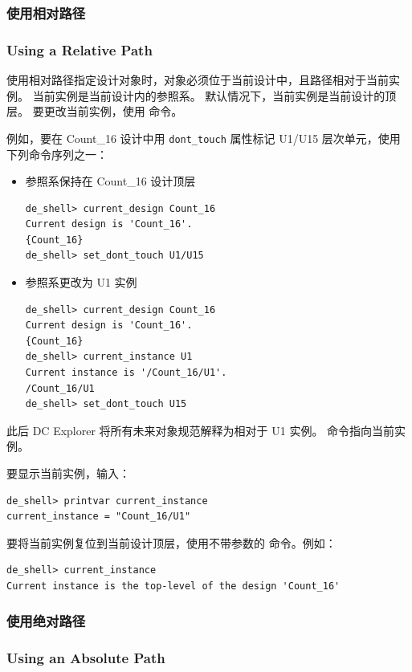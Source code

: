 \subsubsection{使用相对路径}
\subsubsection*{Using a Relative Path}

使用相对路径指定设计对象时，对象必须位于当前设计中，且路径相对于当前实例。
当前实例是当前设计内的参照系。
默认情况下，当前实例是当前设计的顶层。
要更改当前实例，使用  命令。

例如，要在 Count\_16 设计中用 \texttt{dont\_touch} 属性标记 U1/U15 层次单元，使用下列命令序列之一：
\begin{itemize}
  \item 参照系保持在 Count\_16 设计顶层
\begin{lstlisting}
de_shell> current_design Count_16
Current design is 'Count_16'.
{Count_16}
de_shell> set_dont_touch U1/U15
\end{lstlisting}
  \item 参照系更改为 U1 实例
\begin{lstlisting}
de_shell> current_design Count_16
Current design is 'Count_16'.
{Count_16}
de_shell> current_instance U1
Current instance is '/Count_16/U1'.
/Count_16/U1
de_shell> set_dont_touch U15
\end{lstlisting}
\end{itemize}

此后 DC Explorer 将所有未来对象规范解释为相对于 U1 实例。
 命令指向当前实例。

要显示当前实例，输入：
\begin{lstlisting}
de_shell> printvar current_instance
current_instance = "Count_16/U1"
\end{lstlisting}

要将当前实例复位到当前设计顶层，使用不带参数的  命令。例如：
\begin{lstlisting}
de_shell> current_instance
Current instance is the top-level of the design 'Count_16'
\end{lstlisting}

\subsubsection{使用绝对路径}
\subsubsection*{Using an Absolute Path}

